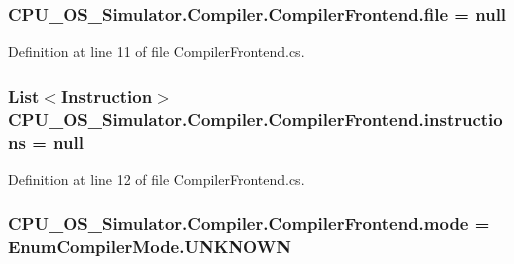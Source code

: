 \subsubsection[{file}]{ C\+P\+U\+\_\+\+O\+S\+\_\+\+Simulator.\+Compiler.\+Compiler\+Frontend.\+file = null\hspace{0.3cm}{\ttfamily [private]}}\label{class_c_p_u___o_s___simulator_1_1_compiler_1_1_compiler_frontend_a57d54910e0df9189cf333b95d9123641}


Definition at line 11 of file Compiler\+Frontend.\+cs.

\hypertarget{class_c_p_u___o_s___simulator_1_1_compiler_1_1_compiler_frontend_aec71846f593e4bdcbd7d63a49b3b25bd}{}
\subsubsection[{instructions}]{\setlength{\rightskip}{0pt plus 5cm}List$<${\bf Instruction}$>$ C\+P\+U\+\_\+\+O\+S\+\_\+\+Simulator.\+Compiler.\+Compiler\+Frontend.\+instructions = null\hspace{0.3cm}{\ttfamily [private]}}\label{class_c_p_u___o_s___simulator_1_1_compiler_1_1_compiler_frontend_aec71846f593e4bdcbd7d63a49b3b25bd}


Definition at line 12 of file Compiler\+Frontend.\+cs.

\hypertarget{class_c_p_u___o_s___simulator_1_1_compiler_1_1_compiler_frontend_aa02bf709b3e3b19e45f89c8c2864afb4}{}
\subsubsection[{mode}]{ C\+P\+U\+\_\+\+O\+S\+\_\+\+Simulator.\+Compiler.\+Compiler\+Frontend.\+mode = {\bf Enum\+Compiler\+Mode.\+U\+N\+K\+N\+O\+W\+N}\hspace{0.3cm}{\ttfamily [private]}}\label{class_c_p_u___o_s___simulator_1_1_compiler_1_1_compiler_frontend_aa02bf709b3e3b19e45f89c8c2864afb4}


